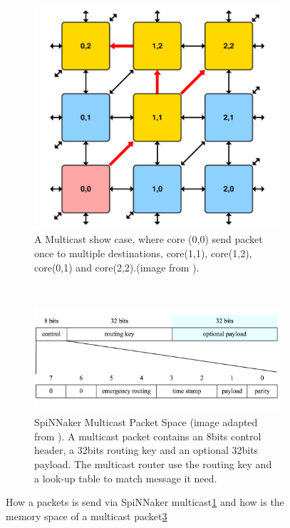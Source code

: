 \begin{itemize}
\begin{figure}[!ht]
    \begin{subfigure}[b]{0.9\textwidth}
    \centering
    \includegraphics[width = 0.7\hsize]{figures/multicast.png}
    \caption{A Multicast show case, where core (0,0) send packet once to multiple destinations, core(1,1), core(1,2), core(0,1) and core(2,2).(image from \cite{ws6}).}
    \label{fig:multicast}
    \end{subfigure}
    ~
    \begin{subfigure}[b]{0.9\textwidth}
    \centering
    \includegraphics[width = 1\hsize]{figures/mc_pkt_layout.png}
    \caption{SpiNNaker Multicast Packet Space (image adapted from \cite{mc_pkt_layout}). A multicast packet contains an 8bits control header, a 32bits routing key and an optional 32bits payload. The multicast router use the routing key and a look-up table to match message it need.}
    \label{fig:mc_pkt_layout}
    \end{subfigure}
    \caption{How a packets is send via SpiNNaker multicast\ref{fig:multicast} and how is the memory space of a multicast packet\ref{fig:mc_pkt_layout}}
\end{figure}
\end{itemize}

